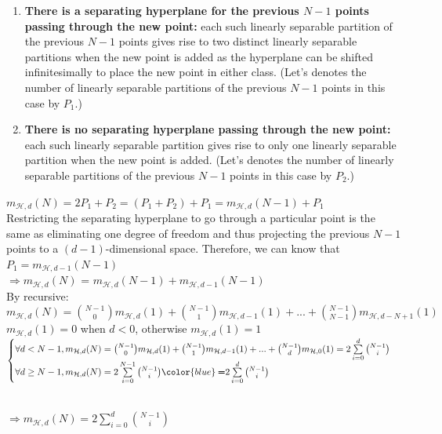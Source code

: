 \documentclass[12pt, a4paper]{article}
\begin{document}
\begin{CJK}{UTF8}{bkai}
		\begin{enumerate}
		\item
			{\bf There is a separating hyperplane for the previous $N-1$ points passing through the new point:} each such linearly separable partition of the previous $N-1$ points gives rise to two distinct linearly separable partitions when the new point is added as the hyperplane can be shifted infinitesimally to place the new point in either class.
			(Let's denotes the number of linearly separable partitions of the previous $N-1$ points in this case by $P_1$.)
		\item
			{\bf There is no separating hyperplane passing through the new point:} each such linearly separable partition gives rise to only one linearly separable partition when the new point is added.
			(Let's denotes the number of linearly separable partitions of the previous $N-1$ points in this case by $P_2$.)
		\end{enumerate}
		$m_{\mathcal{H}, d}(N) = 2P_1+P_2 = (P_1+P_2)+P_1 = m_{\mathcal{H}, d}(N-1)+P_1$\\
		Restricting the separating hyperplane to go through a particular point is the same as eliminating one degree of freedom and thus projecting the previous $N-1$ points to a $(d-1)$-dimensional space. Therefore, we can know that $P_1 = m_{\mathcal{H}, d-1}(N-1)$\\
		$\Rightarrow m_{\mathcal{H}, d}(N)$ = $m_{\mathcal{H}, d}(N-1)+m_{\mathcal{H}, d-1}(N-1)$ \\
		By recursive: $m_{\mathcal{H}, d}(N) = \binom{N-1}{0}m_{\mathcal{H}, d}(1)+\binom{N-1}{1}m_{\mathcal{H}, d-1}(1)+...+\binom{N-1}{N-1}m_{\mathcal{H}, d-N+1}(1)$\\
		$m_{\mathcal{H}, d}(1) = 0$ when $d < 0$, otherwise $m_{\mathcal{H}, d}(1) = 1$\\
		$\begin{cases}
			\forall d < N-1,  m_{\mathcal{H}, d}(N) = \binom{N-1}{0}m_{\mathcal{H}, d}(1)+\binom{N-1}{1}m_{\mathcal{H}, d-1}(1)+...+\binom{N-1}{d}m_{\mathcal{H}, 0}(1) = 2\sum\limits_{i=0}^d \binom{N-1}{i}\\
			\forall d \geq N-1, m_{\mathcal{H}, d}(N) = 2\sum\limits_{i=0}^{N-1} \binom{N-1}{i} {\color{blue} \pmb=} 2\sum\limits_{i=0}^d \binom{N-1}{i} \\
		\end{cases}$\par
		\\
		$\Rightarrow m_{\mathcal{H}, d}(N) = 2\sum\limits_{i=0}^d \binom{N-1}{i}$ \\
		

	\clearpage
	\end{CJK}
\end{document}
